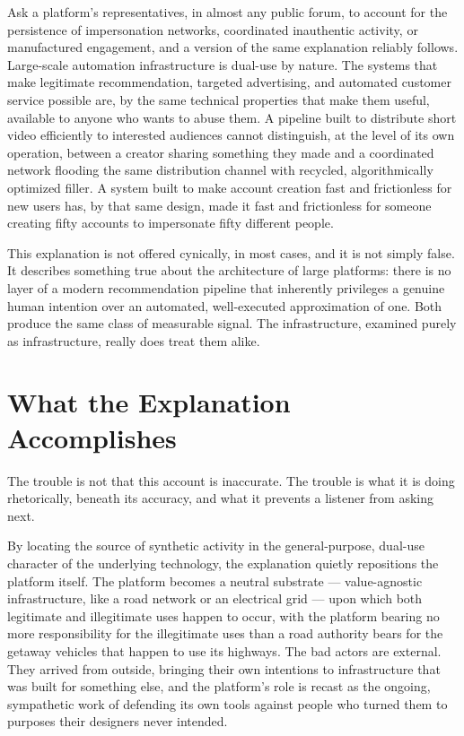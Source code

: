 \documentclass[12pt,a4paper]{book}
\begin{document}
Ask a platform's representatives, in almost any public forum, to account for the persistence of impersonation networks, coordinated inauthentic activity, or manufactured engagement, and a version of the same explanation reliably follows. Large-scale automation infrastructure is dual-use by nature. The systems that make legitimate recommendation, targeted advertising, and automated customer service possible are, by the same technical properties that make them useful, available to anyone who wants to abuse them. A pipeline built to distribute short video efficiently to interested audiences cannot distinguish, at the level of its own operation, between a creator sharing something they made and a coordinated network flooding the same distribution channel with recycled, algorithmically optimized filler. A system built to make account creation fast and frictionless for new users has, by that same design, made it fast and frictionless for someone creating fifty accounts to impersonate fifty different people.

This explanation is not offered cynically, in most cases, and it is not simply false. It describes something true about the architecture of large platforms: there is no layer of a modern recommendation pipeline that inherently privileges a genuine human intention over an automated, well-executed approximation of one. Both produce the same class of measurable signal. The infrastructure, examined purely as infrastructure, really does treat them alike.

\section{What the Explanation Accomplishes}

The trouble is not that this account is inaccurate. The trouble is what it is doing rhetorically, beneath its accuracy, and what it prevents a listener from asking next.

By locating the source of synthetic activity in the general-purpose, dual-use character of the underlying technology, the explanation quietly repositions the platform itself. The platform becomes a neutral substrate — value-agnostic infrastructure, like a road network or an electrical grid — upon which both legitimate and illegitimate uses happen to occur, with the platform bearing no more responsibility for the illegitimate uses than a road authority bears for the getaway vehicles that happen to use its highways. The bad actors are external. They arrived from outside, bringing their own intentions to infrastructure that was built for something else, and the platform's role is recast as the ongoing, sympathetic work of defending its own tools against people who turned them to purposes their designers never intended.
\end{document}
